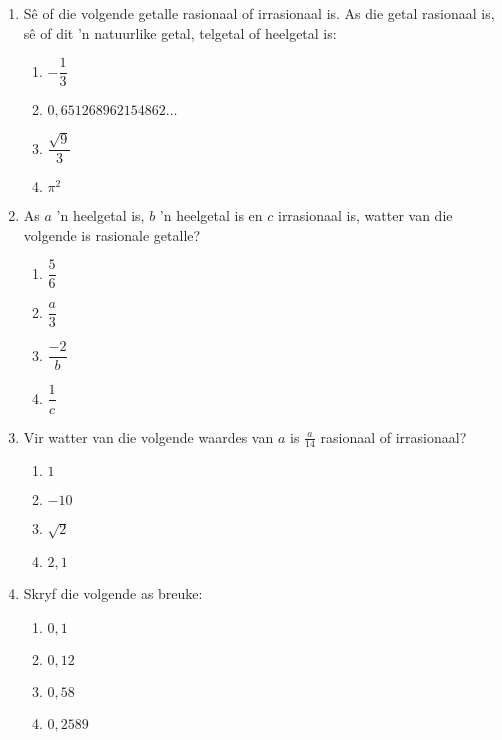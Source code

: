 \begin{exercises}{}{
\begin{enumerate}[itemsep=5pt, label=\textbf{\arabic*}. ] 
\item Sê of die volgende getalle rasionaal of irrasionaal is. As die getal rasionaal is, sê of dit 'n natuurlike getal, telgetal of heelgetal is:
\begin{enumerate}[itemsep=5pt, label=\textbf{(\alph*)} ] 
    \item $-\dfrac{1}{3}$
    \item $0,651268962154862\ldots$
    \item $\dfrac{\sqrt{9}}{3}$
    \item $\pi^2$
\end{enumerate}
\item As $a$ 'n heelgetal is, $b$ 'n heelgetal is en $c$ irrasionaal is, watter van die volgende is rasionale getalle? 
\begin{enumerate}[itemsep=5pt, label=\textbf{(\alph*)} ] 
    \item $\dfrac{5}{6}$
    \item $\dfrac{a}{3}$
    \item $\dfrac{-2}{b}$
    \item $\dfrac{1}{c}$
    \end{enumerate}
\item Vir watter van die volgende waardes van $a$ is $\frac{a}{14}$ rasionaal of irrasionaal?
\begin{enumerate}[itemsep=5pt, label=\textbf{(\alph*)} ] 
    \item $1$
    \item $-10$
    \item $\sqrt{2}$
    \item $2,1$
    \end{enumerate}

\item Skryf die volgende as breuke:
\begin{enumerate}[itemsep=5pt, label=\textbf{(\alph*)} ] 
    \item $0,1$
    \item $0,12$
    \item $0,58$
    \item $0,2589$
    \end{enumerate}


\end{enumerate}}
\end{exercises}
